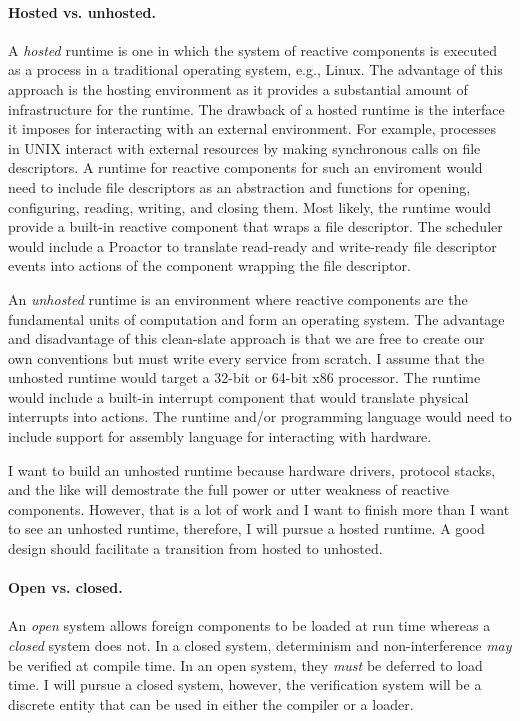 \documentclass[letterpaper]{article}
\theoremstyle{definition} \newtheorem{constraint}{Constraint}
\begin{document}
\paragraph{Hosted vs. unhosted.}
A \emph{hosted} runtime is one in which the system of reactive components is executed as a process in a traditional operating system, e.g., Linux.
The advantage of this approach is the hosting environment as it provides a substantial amount of infrastructure for the runtime.
The drawback of a hosted runtime is the interface it imposes for interacting with an external environment.
For example, processes in UNIX interact with external resources by making synchronous calls on file descriptors.
A runtime for reactive components for such an enviroment would need to include file descriptors as an abstraction and functions for opening, configuring, reading, writing, and closing them.
Most likely, the runtime would provide a built-in reactive component that wraps a file descriptor.
The scheduler would include a Proactor to translate read-ready and write-ready file descriptor events into actions of the component wrapping the file descriptor.

An \emph{unhosted} runtime is an environment where reactive components are the fundamental units of computation and form an operating system.
The advantage and disadvantage of this clean-slate approach is that we are free to create our own conventions but must write every service from scratch.
I assume that the unhosted runtime would target a 32-bit or 64-bit x86 processor.
The runtime would include a built-in interrupt component that would translate physical interrupts into actions.
The runtime and/or programming language would need to include support for assembly language for interacting with hardware.

I want to build an unhosted runtime because hardware drivers, protocol stacks, and the like will demostrate the full power or utter weakness of reactive components.
However, that is a lot of work and I want to finish more than I want to see an unhosted runtime, therefore, I will pursue a hosted runtime.
A good design should facilitate a transition from hosted to unhosted.

\paragraph{Open vs. closed.}
An \emph{open} system allows foreign components to be loaded at run time whereas a \emph{closed} system does not.
In a closed system, determinism and non-interference \emph{may} be verified at compile time.
In an open system, they \emph{must} be deferred to load time.
I will pursue a closed system, however, the verification system will be a discrete entity that can be used in either the compiler or a loader.
\end{document}
